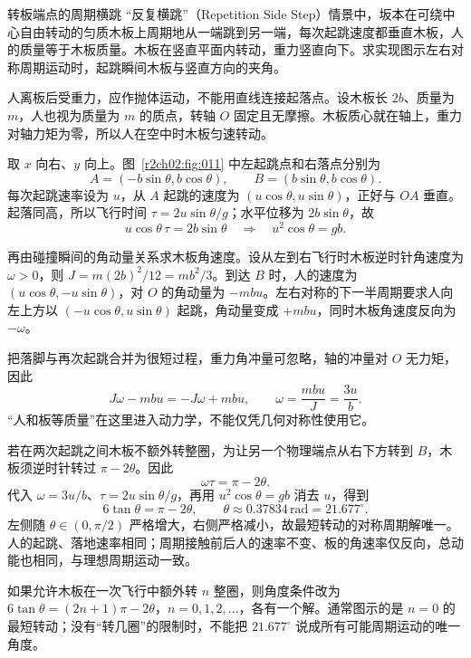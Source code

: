 \begin{practicebox}{转板端点的周期横跳}
“反复横跳”（Repetition Side Step）情景中，坂本在可绕中心自由转动的匀质木板上周期地从一端跳到另一端，每次起跳速度都垂直木板，人的质量等于木板质量。木板在竖直平面内转动，重力竖直向下。求实现图示左右对称周期运动时，起跳瞬间木板与竖直方向的夹角。
\label{r2ch02:pr:020}
\begin{solution}
人离板后受重力，应作抛体运动，不能用直线连接起落点。设木板长 $2b$、质量为 $m$，人也视为质量为 $m$ 的质点，转轴 $O$ 固定且无摩擦。木板质心就在轴上，重力对轴力矩为零，所以人在空中时木板匀速转动。

取 $x$ 向右、$y$ 向上。图~\ref{r2ch02:fig:011} 中左起跳点和右落点分别为
\[
 A=(-b\sin\theta,b\cos\theta),\qquad
 B=(b\sin\theta,b\cos\theta).
\]
每次起跳速率设为 $u$，从 $A$ 起跳的速度为 $(u\cos\theta,u\sin\theta)$，正好与 $OA$ 垂直。起落同高，所以飞行时间 $\tau=2u\sin\theta/g$；水平位移为 $2b\sin\theta$，故
\[
 u\cos\theta\,\tau=2b\sin\theta
 \quad\Longrightarrow\quad
 \boxed{u^2\cos\theta=gb}.
\]
\figSideStep

再由碰撞瞬间的角动量关系求木板角速度。设从左到右飞行时木板逆时针角速度为 $\omega>0$，则
$J= m(2b)^2/12=mb^2/3$。到达 $B$ 时，人的速度为 $(u\cos\theta,-u\sin\theta)$，对 $O$ 的角动量为 $-mbu$。左右对称的下一半周期要求人向左上方以 $(-u\cos\theta,u\sin\theta)$ 起跳，角动量变成 $+mbu$，同时木板角速度反向为 $-\omega$。

把落脚与再次起跳合并为很短过程，重力角冲量可忽略，轴的冲量对 $O$ 无力矩，因此
\[
 J\omega-mbu=-J\omega+mbu,\qquad
 \boxed{\omega=\frac{mbu}{J}=\frac{3u}{b}}.
\]
“人和板等质量”在这里进入动力学，不能仅凭几何对称性使用它。

若在两次起跳之间木板不额外转整圈，为让另一个物理端点从右下方转到 $B$，木板须逆时针转过 $\pi-2\theta$。因此
\[
 \omega\tau=\pi-2\theta.
\]
代入 $\omega=3u/b$、$\tau=2u\sin\theta/g$，再用 $u^2\cos\theta=gb$ 消去 $u$，得到
\[
 \boxed{6\tan\theta=\pi-2\theta},\qquad
 \boxed{\theta\approx0.37834\,\mathrm{rad}=21.677^\circ}.
\]
左侧随 $\theta\in(0,\pi/2)$ 严格增大，右侧严格减小，故最短转动的对称周期解唯一。人的起跳、落地速率相同；周期接触前后人的速率不变、板的角速率仅反向，总动能也相同，与理想周期运动一致。

如果允许木板在一次飞行中额外转 $n$ 整圈，则角度条件改为
$6\tan\theta=(2n+1)\pi-2\theta$，$n=0,1,2,\ldots$，各有一个解。通常图示的是 $n=0$ 的最短转动；没有“转几圈”的限制时，不能把 $21.677^\circ$ 说成所有可能周期运动的唯一角度。
\end{solution}
\end{practicebox}

